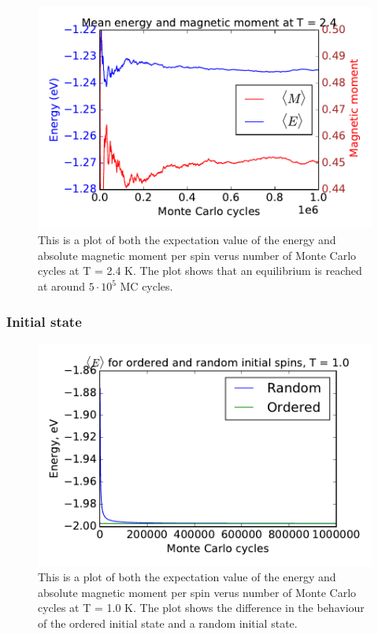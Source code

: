 \begin{figure}[H]
\includegraphics[width=\linewidth]{../results/4c/En_mag_T2_4}\caption{This is a plot of both the expectation value of the energy and absolute magnetic moment per spin verus number of Monte Carlo cycles at T = 2.4 K. The plot shows that an equilibrium is reached at around $5 \cdot 10^{5}$ MC cycles.}\label{fig:L_20_energy_mag_T_2.4}
\end{figure}

\subsubsection{Initial state}

\begin{figure}[H]
\includegraphics[width=\linewidth]{../results/4c/ran_order_T1}\caption{This is a plot of both the expectation value of the energy and absolute magnetic moment per spin verus number of Monte Carlo cycles at T = 1.0 K. The plot shows the difference in the behaviour of the ordered initial state and a random initial state.}\label{fig:L_20_initial_T_1.0}
\end{figure}

